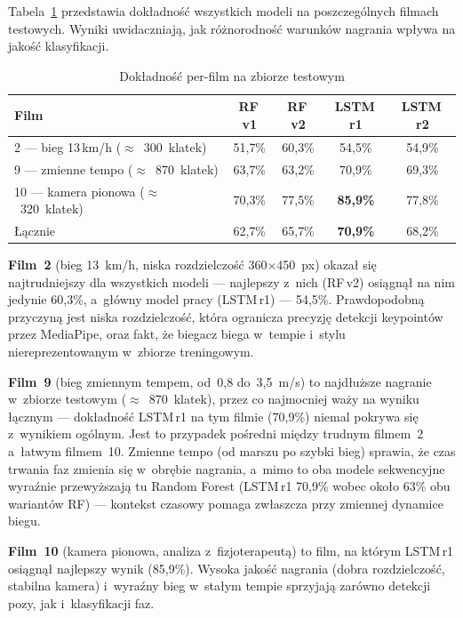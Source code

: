 Tabela~\ref{tab:per-film} przedstawia dokładność wszystkich modeli na poszczególnych filmach testowych. Wyniki uwidaczniają, jak różnorodność warunków nagrania wpływa na jakość klasyfikacji.

\begin{table}[H]
\centering
\caption{Dokładność per-film na zbiorze testowym}
\label{tab:per-film}
\small
\begin{tabular}{lcccc}
\hline
\textbf{Film} & \textbf{RF\,v1} & \textbf{RF\,v2} & \textbf{LSTM\,r1} & \textbf{LSTM\,r2} \\
\hline
2 --- bieg 13\,km/h ($\approx$~300~klatek)      & 51{,}7\% & 60{,}3\% & 54{,}5\% & 54{,}9\% \\
9 --- zmienne tempo ($\approx$~870~klatek)      & 63{,}7\% & 63{,}2\% & 70{,}9\% & 69{,}3\% \\
10 --- kamera pionowa ($\approx$~320~klatek)    & 70{,}3\% & 77{,}5\% & \textbf{85{,}9\%} & 77{,}8\% \\
\hline
Łącznie                               & 62{,}7\% & 65{,}7\% & \textbf{70{,}9\%} & 68{,}2\% \\
\hline
\end{tabular}
\end{table}

\textbf{Film~2} (bieg 13~km/h, niska rozdzielczość 360$\times$450~px) okazał się najtrudniejszy dla wszystkich modeli --- najlepszy z~nich (RF\,v2) osiągnął na nim jedynie 60{,}3\%, a~główny model pracy (LSTM\,r1) --- 54{,}5\%. Prawdopodobną przyczyną jest niska rozdzielczość, która ogranicza precyzję detekcji keypointów przez MediaPipe, oraz fakt, że biegacz biega w~tempie i~stylu niereprezentowanym w~zbiorze treningowym.

\textbf{Film~9} (bieg zmiennym tempem, od~0{,}8 do~3{,}5~m/s) to najdłuższe nagranie w~zbiorze testowym ($\approx$~870~klatek), przez co najmocniej waży na wyniku łącznym --- dokładność LSTM\,r1 na tym filmie (70{,}9\%) niemal pokrywa się z~wynikiem ogólnym. Jest to przypadek pośredni między trudnym filmem~2 a~łatwym filmem~10. Zmienne tempo (od marszu po szybki bieg) sprawia, że czas trwania faz zmienia się w~obrębie nagrania, a~mimo to oba modele sekwencyjne wyraźnie przewyższają tu Random Forest (LSTM\,r1 70{,}9\% wobec około 63\% obu wariantów RF) --- kontekst czasowy pomaga zwłaszcza przy zmiennej dynamice biegu.

\textbf{Film~10} (kamera pionowa, analiza z~fizjoterapeutą) to film, na którym LSTM\,r1 osiągnął najlepszy wynik (85{,}9\%). Wysoka jakość nagrania (dobra rozdzielczość, stabilna kamera) i~wyraźny bieg w~stałym tempie sprzyjają zarówno detekcji pozy, jak i~klasyfikacji faz.

